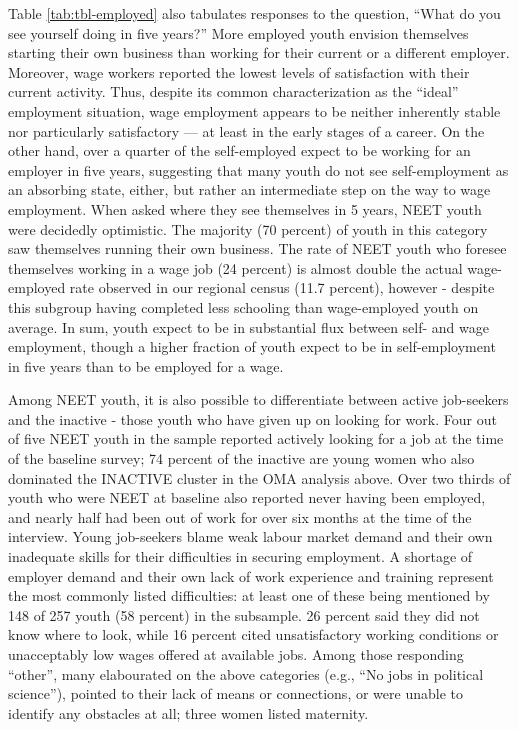 \documentclass[
  a4paper, twoside, 12pt]{book}
\begin{document}
Table \ref{tab:tbl-employed} also tabulates responses to the question, ``What do you see yourself doing in five years?'' More employed youth envision themselves starting their own business than working for their current or a different employer. Moreover, wage workers reported the lowest levels of satisfaction with their current activity. Thus, despite its common characterization as the ``ideal'' employment situation, wage employment appears to be neither inherently stable nor particularly satisfactory --- at least in the early stages of a career. On the other hand, over a quarter of the self-employed expect to be working for an employer in five years, suggesting that many youth do not see self-employment as an absorbing state, either, but rather an intermediate step on the way to wage employment. When asked where they see themselves in 5 years, NEET youth were decidedly optimistic. The majority (70 percent) of youth in this category saw themselves running their own business. The rate of NEET youth who foresee themselves working in a wage job (24 percent) is almost double the actual wage-employed rate observed in our regional census (11.7 percent), however - despite this subgroup having completed less schooling than wage-employed youth on average. In sum, youth expect to be in substantial flux between self- and wage employment, though a higher fraction of youth expect to be in self-employment in five years than to be employed for a wage.

Among NEET youth, it is also possible to differentiate between active job-seekers and the inactive - those youth who have given up on looking for work. Four out of five NEET youth in the sample reported actively looking for a job at the time of the baseline survey; 74 percent of the inactive are young women who also dominated the INACTIVE cluster in the OMA analysis above. Over two thirds of youth who were NEET at baseline also reported never having been employed, and nearly half had been out of work for over six months at the time of the interview. Young job-seekers blame weak labour market demand and their own inadequate skills for their difficulties in securing employment. A shortage of employer demand and their own lack of work experience and training represent the most commonly listed difficulties: at least one of these being mentioned by 148 of 257 youth (58 percent) in the subsample. 26 percent said they did not know where to look, while 16 percent cited unsatisfactory working conditions or unacceptably low wages offered at available jobs. Among those responding ``other'', many elabourated on the above categories (e.g., ``No jobs in political science''), pointed to their lack of means or connections, or were unable to identify any obstacles at all; three women listed maternity.
\end{document}
